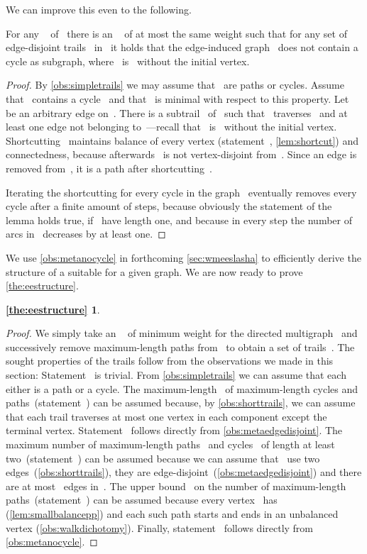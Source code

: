 We can improve this even to the following.
\begin{observation}\label{obs:metanocycle}
  For any \EE{}~ of~ there is an \EE{}~ of at most the same weight such that for any set of edge-disjoint trails~ in~ it holds that the edge-induced graph~ does not contain a cycle as subgraph, where~ is~ without the initial vertex.
\end{observation}
\begin{proof}
  By \autoref{obs:simpletrails} we may assume that~ are paths or cycles. Assume that~ contains a cycle~ and that~ is minimal with respect to this property. Let~ be an arbitrary edge on~. There is a subtrail~ of~ such that~ traverses~ and at least one edge not belonging to~---recall that~ is~ without the initial vertex. Shortcutting~ maintains balance of every vertex (statement~, \autoref{lem:shortcut}) and connectedness, because afterwards~ is not vertex-disjoint from~. Since an edge is removed from~, it is a path after shortcutting~.

  Iterating the shortcutting for every cycle in the graph~ eventually removes every cycle after a finite amount of steps, because obviously the statement of the lemma holds true, if~ have length one, and because in every step the number of arcs in~ decreases by at least one.
\end{proof}
We use \autoref{obs:metanocycle} in forthcoming \autoref{sec:wmeeslasha} to efficiently derive the structure of a suitable \EE{} for a given graph. We are now ready to prove \autoref{the:eestructure}.
\newtheorem*{rep}{\autoref{the:eestructure}}
\begin{rep}
  \eestructuretheorem
\end{rep}
\begin{proof}We simply take an \EE~ of minimum weight for the directed multigraph~ and successively remove maximum-length paths from~ to obtain a set of trails~. The sought properties of the trails follow from the observations we made in this section: Statement~ is trivial. From \autoref{obs:simpletrails} we can assume that each~ either is a path or a cycle. The maximum-length~ of maximum-length cycles and paths~(statement~) can be assumed because, by \autoref{obs:shorttrails}, we can assume that each trail traverses at most one vertex in each component except the terminal vertex. Statement~ follows directly from \autoref{obs:metaedgedisjoint}. The maximum number of maximum-length paths~ and cycles~ of length at least two~(statement~) can be assumed because we can assume that~ use two edges~(\autoref{obs:shorttrails}), they are edge-disjoint~(\autoref{obs:metaedgedisjoint}) and there are at most~ edges in~. The upper bound~ on the number of maximum-length paths~(statement~) can be assumed because every vertex~ has~ (\autoref{lem:smallbalancepp}) and each such path starts and ends in an unbalanced vertex (\autoref{obs:walkdichotomy}). Finally, statement~ follows directly from \autoref{obs:metanocycle}.
\end{proof}



